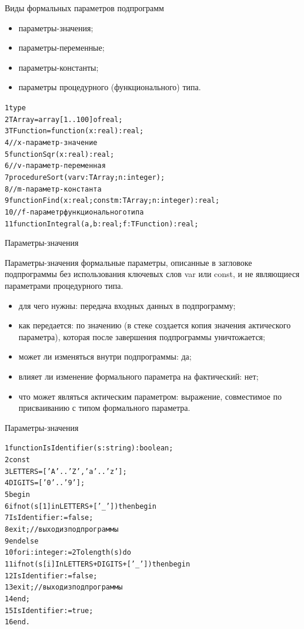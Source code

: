 \documentclass{beamer}
\begin{document}
\begin{frame}[fragile]{Виды формальных параметров подпрограмм}
\begin{itemize}
\item параметры-значения;
\item параметры-переменные;
\item параметры-константы;
\item параметры процедурного (функционального) типа.
\end{itemize}
\begin{alltt}
1 type
2   TArray = array[1..100] of real;
3   TFunction = function(x: real):real; 
4  //x - параметр-значение
5 function Sqr(x: real): real;
6  //v - параметр-переменная
7 procedure Sort(var v: TArray; n: integer);
8  //m - параметр-константа
9 function Find(x: real; const m: TArray; n: integer): real;
10 //f - параметр функционального типа
11 function Integral(a, b: real; f: TFunction): real;
\end{alltt}
\end{frame}

\begin{frame}[fragile]{Параметры-значения}
\begin{block}{Параметры-значения }
формальные параметры, описанные в загловоке подпрограммы без использования ключевых слов var или const, и не являющиеся параметрами процедурного типа.
\end{block}
\begin{itemize}
\item для чего нужны: передача входных данных в подпрограмму;
\item как передается: по значению (в стеке создается копия значения актического параметра), которая после завершения подпрограммы уничтожается;
\item может ли изменяться внутри подпрограммы: да;
\item влияет ли изменение формального параметра на фактический: нет;
\item что может являться актическим параметром: выражение, совместимое по присваиванию с типом формального параметра.
\end{itemize}
\end{frame}

\begin{frame}[fragile]{Параметры-значения}
\begin{alltt}
1 function IsIdentifier(s: string): boolean;
2 const 
3   LETTERS = ['A'..'Z', 'a'..'z'];
4   DIGITS = ['0'..'9'];
5 begin
6   if not (s[1] in LETTERS + ['_']) then begin
7     IsIdentifier := false;
8     exit; //выход из подпрограммы
9   end else	
10   for i: integer := 2 To length(s) do
11     if not (s[i] In LETTERS + DIGITS + ['_']) then begin
12        IsIdentifier := false;
13        exit; //выход из подпрограммы
14     end;
15   IsIdentifier := true;
16 end.
\end{alltt}
\end{frame}
\end{document}
